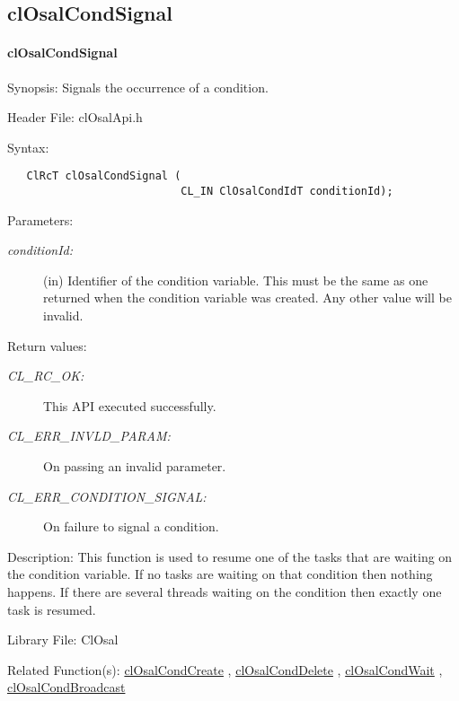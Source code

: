 \newpage
\subsection{clOsalCondSignal}
\hypertarget{pageosal122}{}\paragraph{cl\-Osal\-Cond\-Signal}\label{pageosal122}
\begin{Desc}
\item[Synopsis:]Signals the occurrence of a condition.\end{Desc}
\begin{Desc}
\item[Header File:]clOsalApi.h\end{Desc}
\begin{Desc}
\item[Syntax:]

\footnotesize\begin{verbatim}   ClRcT clOsalCondSignal (
                           CL_IN ClOsalCondIdT conditionId);
\end{verbatim}
\normalsize
\end{Desc}
\begin{Desc}
\item[Parameters:]
\begin{description}
\item[{\em condition\-Id:}](in) Identifier of the condition variable. This must be the same as one returned when the condition variable was created. Any other value will be invalid.\end{description}
\end{Desc}
\begin{Desc}
\item[Return values:]
\begin{description}
\item[{\em CL\_\-RC\_\-OK:}]This API executed successfully. \item[{\em CL\_\-ERR\_\-INVLD\_\-PARAM:}]On passing an invalid parameter. \item[{\em CL\_\-ERR\_\-CONDITION\_\-SIGNAL:}]On failure to signal a condition.\end{description}
\end{Desc}
\begin{Desc}
\item[Description:]This function is used to resume one of the tasks that are waiting on the condition variable. If no tasks are waiting on that condition then nothing happens. If there are several threads waiting on the condition then exactly one task is resumed.\end{Desc}
\begin{Desc}
\item[Library File:]Cl\-Osal\end{Desc}
\begin{Desc}
\item[Related Function(s):]\hyperlink{pageosal118}{cl\-Osal\-Cond\-Create} , \hyperlink{pageosal119}{cl\-Osal\-Cond\-Delete} , 
\hyperlink{pageosal120}{cl\-Osal\-Cond\-Wait} , \hyperlink{pageosal121}{cl\-Osal\-Cond\-Broadcast} \end{Desc}

